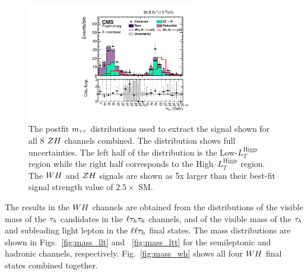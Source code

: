 \begin{figure}[h!]
 \begin{center}
  \includegraphics[width=0.65\textwidth]{higgs_to_taus_vh/plots/zh/zh_postfit.pdf}
 \end{center}
 \caption{The postfit $m_{\tau\tau}$ distributions used to extract the signal shown
  for all 8 $ZH$ channels combined.
  The distribution shows full uncertainties.
  The left half of the distribution is the Low-$L_{T}^{\textrm{Higgs}}$ region
  while the right half corresponds to the High--$L_{T}^{\textrm{Higgs}}$ region.
  The $WH$ and $ZH$ signals are shown as 5x larger than their best-fit
  signal strength value of $2.5 \times$ SM.
 }
 \label{fig:zh_results_svFitAll}
\end{figure}

The results in the $WH$ channels are obtained from the distributions of the 
visible mass of the $\tau_{h}$ candidates in the $\ell\tau_{h}\tau_{h}$ channels, 
and of the visible mass of the $\tau_{h}$ and subleading light lepton in the 
$\ell\ell\tau_{h}$ final states. The mass distributions
are shown in Figs.~\ref{fig:mass_llt} and ~\ref{fig:mass_ltt} for the semileptonic 
and hadronic channels, respectively. Fig.~\ref{fig:mass_wh} shows all
four $WH$ final states combined together.


